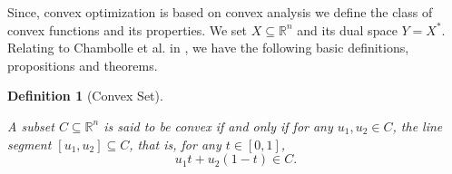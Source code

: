 \documentclass{scrreprt}
\newtheorem{definition}[theorem]{Definition}
\begin{document}
        Since, convex optimization is based on convex analysis we define the class of convex functions and its properties. We set $X \subseteq \mathbb{R}^{n}$ and its dual space $Y = X^{\ast}$. Relating to Chambolle et al. in \cite{Chambolle-et-al-10}, we have the following basic definitions, propositions and theorems.

        \begin{definition}[Convex Set] %
        \label{def:convex_set}

            A subset $C \subseteq \mathbb{R}^{n}$ is said to be convex if and only if for any $u_{1}, u_{2} \in C$, the line segment $[u_{1}, u_{2}] \subseteq C$, that is, for any $t \in [0, 1]$,
                $$
                    u_{1}t + u_{2}(1 - t) \in C.
                $$
        \end{definition}
\end{document}
